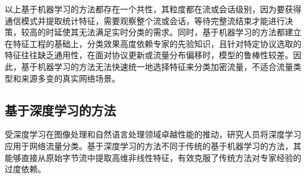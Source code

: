 以上基于机器学习的方法都存在一个共性，其粒度都在流或会话级别，因为要获得通信模式并提取统计特征，需要观察整个流或会话，等待完整流结束才能进行决策，较高的时延使其无法满足实时分类的需求。同时，基于机器学习的方法都建立在特征工程的基础上，分类效果高度依赖专家的先验知识，且针对特定协议选取的特征往往缺乏通用性，在面对协议更新或流量分布偏移时，模型的鲁棒性较差。因此，基于机器学习的方法无法快速统一地选择特征来分类加密流量，不适合流量类型和来源多变的真实网络场景。

\subsection{基于深度学习的方法}

受深度学习在图像处理和自然语言处理领域卓越性能的推动，研究人员将深度学习应用于网络流量分类。基于深度学习的方法不同于传统的基于机器学习的方法，其能够直接从原始字节流中提取高维非线性特征，有效克服了传统方法对专家经验的过度依赖。

